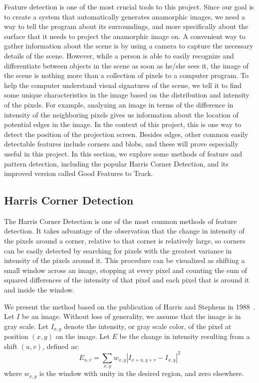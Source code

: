 \documentclass[11pt, oneside, reqno]{book}
\begin{document}
Feature detection is one of the most crucial tools to this project. Since our goal is to create a system that automatically generates anamorphic images, we need a way to tell the program about its surroundings, and more specifically about the surface that it needs to project the anamorphic image on. A convenient way to gather information about the scene is by using a camera to capture the necessary details of the scene. However, while a person is able to easily recognize and differentiate between objects in the scene as soon as he/she sees it, the image of the scene is nothing more than a collection of pixels to a computer program. To help the computer understand visual signatures of the scene, we tell it to find some unique characteristics in the image based on the distribution and intensity of the pixels. For example, analyzing an image in terms of the difference in intensity of the neighboring pixels gives us information about the location of potential edges in the image. In the context of this project, this is one way to detect the position of the projection screen. Besides edges, other common easily detectable features include corners and blobs, and these will prove especially useful in this project. In this section, we explore some methods of feature and pattern detection, including the popular Harris Corner Detection, and its improved version called Good Features to Track.%


\subsection{Harris Corner Detection}
\label{ssec:harris}

The Harris Corner Detection is one of the most common methods of feature detection. 
It takes advantage of the observation that the change in intensity of the pixels around a corner, relative to that corner is relatively large, so corners can be easily detected by searching for pixels with the greatest variance in intensity of the pixels around it. This procedure can be visualized as shifting a small window across an image, stopping at every pixel and counting the sum of squared differences of the intensity of that pixel and each pixel that is around it and inside the window.

We present the method based on the publication of Harris and Stephens in 1988~\cite{harris1988combined}. Let $I$ be an image. Without loss of generality, we assume that the image is in gray scale. Let $I_{x,y}$ denote the intensity, or gray scale color, of the pixel at position $(x,y)$ on the image. Let $E$ be the change in intensity resulting from a shift $(u,v)$, defined as:
\[
	E_{u,v} = \sum_{x,y} w_{x,y} \left| I_{x+u, y+v} - I_{x,y} \right| ^2
\]
where $w_{x,y}$ is the window with unity in the desired region, and zero elsewhere. 
\end{document}
